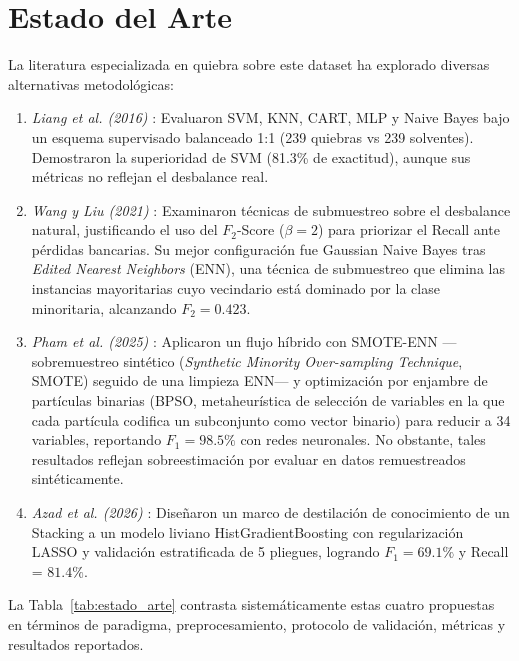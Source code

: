 \documentclass[journal]{IEEEtran}
\begin{document}
\section{Estado del Arte}
La literatura especializada en quiebra sobre este dataset ha explorado diversas alternativas metodológicas:
\begin{enumerate}
    \item \textit{Liang et al. (2016)} \cite{liang2016financial}: Evaluaron SVM, KNN, CART, MLP y Naive Bayes bajo un esquema supervisado balanceado 1:1 (239 quiebras vs 239 solventes). Demostraron la superioridad de SVM (81.3\% de exactitud), aunque sus métricas no reflejan el desbalance real.
    \item \textit{Wang y Liu (2021)} \cite{wang2021undersampling}: Examinaron técnicas de submuestreo sobre el desbalance natural, justificando el uso del $F_2$-Score ($\beta=2$) para priorizar el Recall ante pérdidas bancarias. Su mejor configuración fue Gaussian Naive Bayes tras \textit{Edited Nearest Neighbors} (ENN), una técnica de submuestreo que elimina las instancias mayoritarias cuyo vecindario está dominado por la clase minoritaria, alcanzando $F_2 = 0.423$.
    \item \textit{Pham et al. (2025)} \cite{pham2025comprehensive}: Aplicaron un flujo híbrido con SMOTE-ENN —sobremuestreo sintético (\textit{Synthetic Minority Over-sampling Technique}, SMOTE) seguido de una limpieza ENN— y optimización por enjambre de partículas binarias (BPSO, metaheurística de selección de variables en la que cada partícula codifica un subconjunto como vector binario) para reducir a 34 variables, reportando $F_1 = 98.5\%$ con redes neuronales. No obstante, tales resultados reflejan sobreestimación por evaluar en datos remuestreados sintéticamente.
    \item \textit{Azad et al. (2026)} \cite{azad2026predicting}: Diseñaron un marco de destilación de conocimiento de un Stacking a un modelo liviano HistGradientBoosting con regularización LASSO y validación estratificada de 5 pliegues, logrando $F_1 = 69.1\%$ y Recall = $81.4\%$.
\end{enumerate}

La Tabla~\ref{tab:estado_arte} contrasta sistemáticamente estas cuatro propuestas en términos de paradigma, preprocesamiento, protocolo de validación, métricas y resultados reportados.
\end{document}
